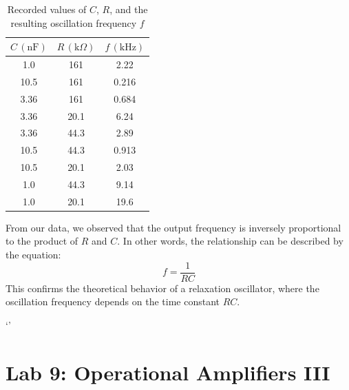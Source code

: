 \documentclass{article}
\begin{document}
\begin{table}[H]
    \centering
    \begin{tabular}{|c|c|c|}
        \hline
        \( C \, (\text{nF}) \) & \( R \, (\text{k}\Omega) \) & \( f \, (\text{kHz}) \) \\
        \hline
        1.0  & 161   & 2.22 \\
        10.5 & 161   & 0.216 \\
        3.36 & 161   & 0.684 \\
        3.36 & 20.1  & 6.24  \\
        3.36 & 44.3  & 2.89  \\
        10.5 & 44.3  & 0.913 \\
        10.5 & 20.1  & 2.03  \\
        1.0  & 44.3  & 9.14  \\
        1.0  & 20.1  & 19.6  \\
        \hline
    \end{tabular}
    \caption{Recorded values of \( C \), \( R \), and the resulting oscillation frequency \( f \)}
\end{table}

From our data, we observed that the output frequency is inversely proportional to the product of \( R \) and \( C \). In other words, the relationship can be described by the equation:
\[
f = \frac{1}{RC}
\]
This confirms the theoretical behavior of a relaxation oscillator, where the oscillation frequency depends on the time constant \( RC \).

`'
\section*{Lab 9: Operational Amplifiers III}
\end{document}
